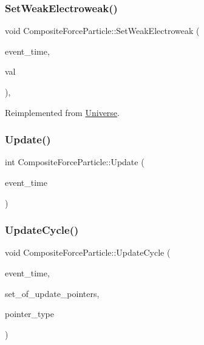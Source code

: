 \subsubsection{\texorpdfstring{Set\+Weak\+Electroweak()}{SetWeakElectroweak()}}
{\footnotesize\ttfamily void Composite\+Force\+Particle\+::\+Set\+Weak\+Electroweak (\begin{DoxyParamCaption}\item[{std\+::chrono\+::time\+\_\+point$<$ \mbox{\hyperlink{universe_8h_a0ef8d951d1ca5ab3cfaf7ab4c7a6fd80}{Clock}} $>$}]{event\+\_\+time,  }\item[{double}]{val }\end{DoxyParamCaption})\hspace{0.3cm}{\ttfamily [inline]}, {\ttfamily [virtual]}}



Reimplemented from \mbox{\hyperlink{classUniverse_a2d3d642bfdc863248e93535832fa4b00}{Universe}}.

\mbox{\label{classCompositeForceParticle_a69b47aaf17ab6faa396c2f6e6c85b2e3}} 
\subsubsection{\texorpdfstring{Update()}{Update()}}
{\footnotesize\ttfamily int Composite\+Force\+Particle\+::\+Update (\begin{DoxyParamCaption}\item[{std\+::chrono\+::time\+\_\+point$<$ \mbox{\hyperlink{universe_8h_a0ef8d951d1ca5ab3cfaf7ab4c7a6fd80}{Clock}} $>$}]{event\+\_\+time }\end{DoxyParamCaption})}

\mbox{\label{classCompositeForceParticle_a578d87e48246ef83f39dce070dff541e}} 
\subsubsection{\texorpdfstring{Update\+Cycle()}{UpdateCycle()}}
{\footnotesize\ttfamily void Composite\+Force\+Particle\+::\+Update\+Cycle (\begin{DoxyParamCaption}\item[{std\+::chrono\+::time\+\_\+point$<$ \mbox{\hyperlink{universe_8h_a0ef8d951d1ca5ab3cfaf7ab4c7a6fd80}{Clock}} $>$}]{event\+\_\+time,  }\item[{std\+::vector$<$ \mbox{\hyperlink{classCompositeForceParticle}{Composite\+Force\+Particle}} $\ast$$>$}]{set\+\_\+of\+\_\+update\+\_\+pointers,  }\item[{unsigned int}]{pointer\+\_\+type }\end{DoxyParamCaption})}



